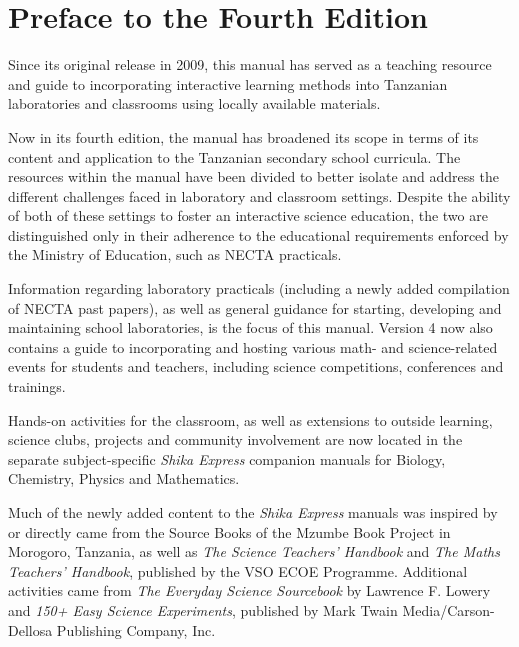 \clearpage
{}
{}
\chapter*{Preface to the Fourth Edition}


Since its original release in 2009, this manual has served as a teaching resource and guide to incorporating interactive learning methods into Tanzanian laboratories and classrooms using locally available materials. 

Now in its fourth edition, the manual has broadened its scope in terms of its content and application to the Tanzanian secondary school curricula. The resources within the manual have been divided to better isolate and address the different challenges faced in laboratory and classroom settings. Despite the ability of both of these settings to foster an interactive science education, the two are distinguished only in their adherence to the educational requirements enforced by the Ministry of Education, such as NECTA practicals. 

Information regarding laboratory practicals (including a newly added compilation of NECTA past papers), as well as general guidance for starting, developing and maintaining school laboratories, is the focus of this manual. Version 4 now also contains a guide to incorporating and hosting various math- and science-related events for students and teachers, including science competitions, conferences and trainings. 

Hands-on activities for the classroom, as well as extensions to outside learning, science clubs, projects and community involvement are now located in the separate subject-specific \emph{Shika Express} companion manuals for Biology, Chemistry, Physics and Mathematics.

Much of the newly added content to the \emph{Shika Express} manuals was inspired by or directly came from the Source Books of the Mzumbe Book Project in Morogoro, Tanzania, as well as \emph{The Science Teachers' Handbook} and \emph{The Maths Teachers' Handbook}, published by the VSO ECOE Programme. Additional activities came from \emph{The Everyday Science Sourcebook} by Lawrence F. Lowery and \emph{150+ Easy Science Experiments}, published by Mark Twain Media/Carson-Dellosa Publishing Company, Inc.

